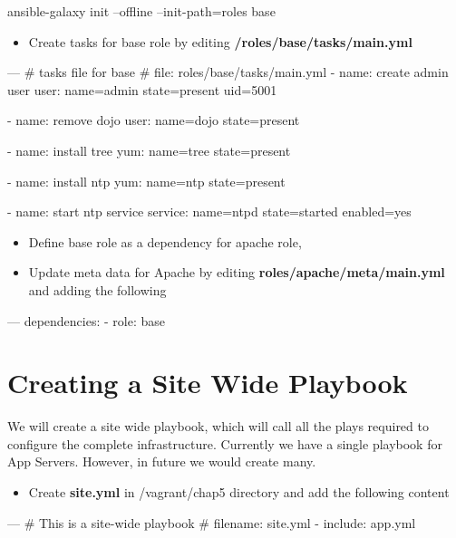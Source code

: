 \begin{code}
ansible-galaxy init --offline --init-path=roles base
\end{code}

\begin{itemize}
\item Create tasks for base role by editing  \textbf{/roles/base/tasks/main.yml}
\end{itemize}

\begin{code}
---
# tasks file for base
# file: roles/base/tasks/main.yml
  - name: create admin user
    user: name=admin state=present uid=5001

  - name: remove dojo
    user: name=dojo  state=present

  - name: install tree
    yum:  name=tree  state=present

  - name: install ntp
    yum:  name=ntp   state=present

  - name: start ntp service
    service: name=ntpd state=started enabled=yes  
\end{code}

\begin{itemize}
\item Define base role as a dependency for  apache role,
\item Update meta data for Apache by editing \textbf{roles/apache/meta/main.yml} and adding the following
\end{itemize}

\begin{code}
---
dependencies:
 - {role: base}
\end{code}

\section{Creating a Site Wide Playbook}

We will create a site wide playbook, which will call all the plays required to configure the complete infrastructure. Currently we have a single  playbook for App Servers. However, in future we would create many.

\begin{itemize}
\item Create \textbf{site.yml} in /vagrant/chap5 directory and add the following content
\end{itemize}

\begin{code}
---
# This is a site-wide playbook
# filename: site.yml
- include: app.yml
\end{code}

